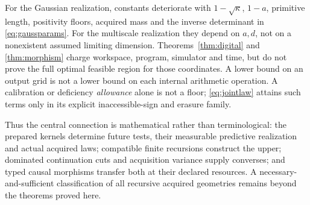 For the Gaussian realization, constants deteriorate with $1-\sqrt\kappa$, $1-a$, primitive length, positivity floors, acquired mass and the inverse determinant in \eqref{eq:gaussparams}. For the multiscale realization they depend on $a,d$, not on a nonexistent assumed limiting dimension. Theorems~\ref{thm:digital} and \ref{thm:morphism} charge workspace, program, simulator and time, but do not prove the full optimal feasible region for those coordinates. A lower bound on an output grid is not a lower bound on each internal arithmetic operation. A calibration or deficiency \emph{allowance} alone is not a floor; \eqref{eq:jointlaw} attains such terms only in its explicit inaccessible-sign and erasure family.

Thus the central connection is mathematical rather than terminological: the prepared kernels determine future tests, their measurable predictive realization and actual acquired laws; compatible finite recursions construct the upper; dominated continuation cuts and acquisition variance supply converses; and typed causal morphisms transfer both at their declared resources. A necessary-and-sufficient classification of all recursive acquired geometries remains beyond the theorems proved here.
